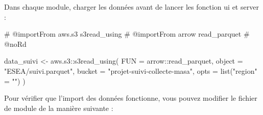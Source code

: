 \documentclass[
  letterpaper,
  DIV=11,
  numbers=noendperiod]{scrreprt}
\newenvironment{Shaded}{\begin{snugshade}}{\end{snugshade}}
\newcommand{\AttributeTok}[1]{\textcolor[rgb]{0.40,0.45,0.13}{#1}}
\newcommand{\CommentTok}[1]{\textcolor[rgb]{0.37,0.37,0.37}{#1}}
\newcommand{\ControlFlowTok}[1]{\textcolor[rgb]{0.00,0.23,0.31}{#1}}
\newcommand{\FunctionTok}[1]{\textcolor[rgb]{0.28,0.35,0.67}{#1}}
\newcommand{\NormalTok}[1]{\textcolor[rgb]{0.00,0.23,0.31}{#1}}
\newcommand{\OtherTok}[1]{\textcolor[rgb]{0.00,0.23,0.31}{#1}}
\newcommand{\SpecialCharTok}[1]{\textcolor[rgb]{0.37,0.37,0.37}{#1}}
\newcommand{\StringTok}[1]{\textcolor[rgb]{0.13,0.47,0.30}{#1}}
\begin{document}
Dans chaque module, charger les données avant de lancer les fonction ui
et server :

\begin{Shaded}
\begin{Highlighting}[]
\CommentTok{\#\textquotesingle{} @importFrom aws.s3 s3read\_using}
\CommentTok{\#\textquotesingle{} @importFrom arrow read\_parquet}
\CommentTok{\#\textquotesingle{} @noRd}

\NormalTok{data\_suivi }\OtherTok{\textless{}{-}}\NormalTok{ aws.s3}\SpecialCharTok{::}\FunctionTok{s3read\_using}\NormalTok{(}
  \AttributeTok{FUN =}\NormalTok{ arrow}\SpecialCharTok{::}\NormalTok{read\_parquet,}
  \AttributeTok{object =} \StringTok{"ESEA/suivi.parquet"}\NormalTok{,}
  \AttributeTok{bucket =} \StringTok{"projet{-}suivi{-}collecte{-}masa"}\NormalTok{,}
  \AttributeTok{opts =} \FunctionTok{list}\NormalTok{(}\StringTok{"region"} \OtherTok{=} \StringTok{""}\NormalTok{)}
\NormalTok{)}
\end{Highlighting}
\end{Shaded}

Pour vérifier que l'import des données fonctionne, vous pouvez modifier
le fichier de module de la manière suivante :

\begin{Shaded}
\end{Shaded}
\end{document}
